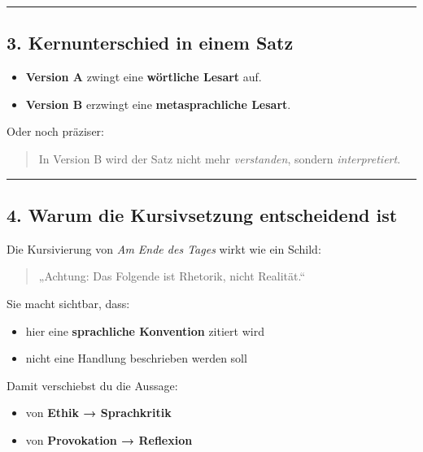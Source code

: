 \documentclass[
  letterpaper,
  DIV=11,
  numbers=noendperiod]{scrartcl}
\providecommand{\tightlist}{%
  \setlength{\itemsep}{0pt}\setlength{\parskip}{0pt}}
\begin{document}
\begin{center}\rule{0.5\linewidth}{0.5pt}\end{center}

\subsection{3. Kernunterschied in einem
Satz}\label{kernunterschied-in-einem-satz}

\begin{itemize}
\tightlist
\item
  \textbf{Version A} zwingt eine \textbf{wörtliche Lesart} auf.
\item
  \textbf{Version B} erzwingt eine \textbf{metasprachliche Lesart}.
\end{itemize}

Oder noch präziser:

\begin{quote}
In Version B wird der Satz nicht mehr \emph{verstanden}, sondern
\emph{interpretiert}.
\end{quote}

\begin{center}\rule{0.5\linewidth}{0.5pt}\end{center}

\subsection{4. Warum die Kursivsetzung entscheidend
ist}\label{warum-die-kursivsetzung-entscheidend-ist}

Die Kursivierung von \emph{Am Ende des Tages} wirkt wie ein Schild:

\begin{quote}
„Achtung: Das Folgende ist Rhetorik, nicht Realität.``
\end{quote}

Sie macht sichtbar, dass:

\begin{itemize}
\tightlist
\item
  hier eine \textbf{sprachliche Konvention} zitiert wird
\item
  nicht eine Handlung beschrieben werden soll
\end{itemize}

Damit verschiebst du die Aussage:

\begin{itemize}
\tightlist
\item
  von \textbf{Ethik → Sprachkritik}
\item
  von \textbf{Provokation → Reflexion}
\end{itemize}
\end{document}
